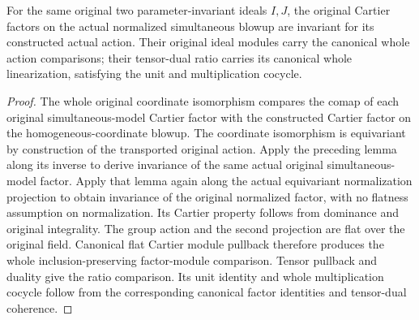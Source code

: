 \begin{theorem}
\label{thm:pl-original-normalized-cartier-factor-linearizations}
\leanok
{}
For the same original two parameter-invariant ideals $I,J$, the original
Cartier factors on the actual normalized simultaneous blowup are invariant
for its constructed actual action. Their original ideal modules carry the
canonical whole action comparisons; their tensor-dual ratio carries its
canonical whole linearization, satisfying the unit and multiplication cocycle.
\end{theorem}
\begin{proof}
The whole original coordinate isomorphism compares the comap of each original
simultaneous-model Cartier factor with the constructed Cartier
factor on the homogeneous-coordinate blowup. The coordinate isomorphism is
equivariant by construction of the transported original action. Apply the
preceding lemma along its inverse to derive invariance of the same actual
original simultaneous-model factor. Apply that lemma again along the actual
equivariant normalization projection to obtain invariance of the original
normalized factor, with no flatness assumption on normalization. Its Cartier
property follows from dominance and original integrality. The group action
and the second projection are flat over the original field. Canonical flat
Cartier module pullback therefore produces the whole inclusion-preserving
factor-module comparison. Tensor pullback and duality give the ratio
comparison. Its unit identity and whole multiplication cocycle follow from
the corresponding canonical factor identities and tensor-dual coherence.
\end{proof}
